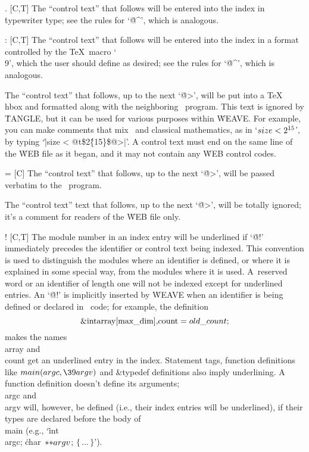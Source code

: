 \@. [C,T] The ``control text'' that follows will be entered into the index
in \.{typewriter} \.{type}; see the rules for `\.{@\^}', which is analogous.

\@: [C,T] The ``control text'' that follows will be entered into the index
in a format controlled by the \TeX\ macro `\.{\\9}', which the user
should define as desired; see the rules for `\.{@\^}', which is analogous.

\@t [C] The ``control text'' that follows, up to the next `\.{@>}', will
be put into a \TeX\ \.{\\hbox} and formatted along with the neighboring
\Cee\ program. This text is ignored by \.{TANGLE}, but it can be used
for various purposes within \.{WEAVE}. For example, you can make comments
that mix \Cee\ and classical mathematics, as in `$\\{size}<2^{15}$', by
typing `\.{|size < @t\$2\^\{15\}\$@>|}'.  A control text must end on the
same line of the \.{WEB} file as it began, and it may not contain any
\.{WEB} control codes.

\@= [C] The ``control text'' that follows, up to the next `\.{@>}', will
be passed verbatim to the \Cee\ program.

\@q [C,T] The ``control text'' text that follows, up to the next `\.{@>}', will
be totally ignored; it's a comment for readers of the \.{WEB} file only.

\@! [C,T] The module number in an index entry will be underlined if `\.{@!}'
immediately precedes the identifier or control text being indexed. This
convention is used to distinguish the modules where an identifier is
defined, or where it is explained in some special way, from the modules
where it is used. A~reserved word or an identifier of length one will not
be indexed except for underlined entries. An `\.{@!}' is implicitly inserted
by \.{WEAVE} when an identifier is being defined or declared in \Cee\
code; for example, the definition 
$$\hbox{\&{int} \\{array}[\\{max\_dim}], \\{count}${}=\\{old\_count};$}$$
makes the names \\{array} and \\{count} get an underlined entry in the
index.  Statement tags, function definitions like
$\\{main}(\\{argc},\39\\{argv})$ and \&{typedef} definitions also
imply underlining. A function definition doesn't define its arguments;
\\{argc} and \\{argv} will, however, be defined
(i.e., their index entries will be underlined), if their types are
declared before the body of \\{main} (e.g., `\.{int}~\\{argc};
\.{char}~${**}\\{argv}$; $\{\,\ldots\,\}$').

